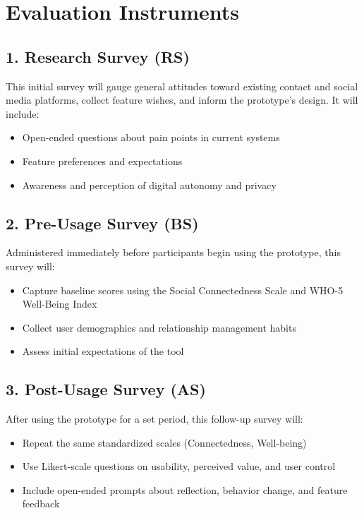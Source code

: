 \documentclass{imc-inf}
\begin{document}
\section{Evaluation Instruments}

\subsection*{1. Research Survey (RS)}
This initial survey will gauge general attitudes toward existing contact and social media platforms, collect feature wishes, and inform the prototype’s design. It will include:
\begin{itemize}
  \item Open-ended questions about pain points in current systems
  \item Feature preferences and expectations
  \item Awareness and perception of digital autonomy and privacy
\end{itemize}

\subsection*{2. Pre-Usage Survey (BS)}
Administered immediately before participants begin using the prototype, this survey will:
\begin{itemize}
  \item Capture baseline scores using the Social Connectedness Scale and WHO-5 Well-Being Index
  \item Collect user demographics and relationship management habits
  \item Assess initial expectations of the tool
\end{itemize}

\subsection*{3. Post-Usage Survey (AS)}
After using the prototype for a set period, this follow-up survey will:
\begin{itemize}
  \item Repeat the same standardized scales (Connectedness, Well-being)
  \item Use Likert-scale questions on usability, perceived value, and user control
  \item Include open-ended prompts about reflection, behavior change, and feature feedback
\end{itemize}
\end{document}
